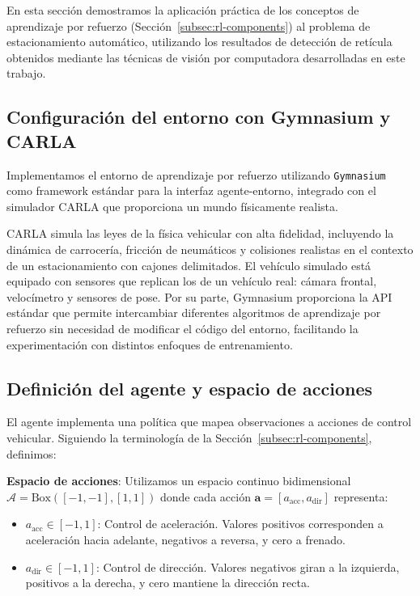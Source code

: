 
En esta sección demostramos la aplicación práctica de los conceptos de aprendizaje por refuerzo
(Sección~\ref{subsec:rl-components}) al problema de estacionamiento automático, utilizando
los resultados de detección de retícula obtenidos mediante las técnicas de visión por computadora
desarrolladas en este trabajo.

\subsection{Configuración del entorno con Gymnasium y CARLA}\label{subsec:rl-environment}

Implementamos el entorno de aprendizaje por refuerzo utilizando \texttt{Gymnasium} como framework
estándar para la interfaz agente-entorno, integrado con el simulador CARLA que proporciona
un mundo físicamente realista. 

CARLA simula las leyes de la física vehicular con alta fidelidad, incluyendo la dinámica de carrocería, 
fricción de neumáticos y colisiones realistas en el contexto de un estacionamiento con cajones delimitados. 
El vehículo simulado está equipado con sensores que replican los de un vehículo real: cámara frontal, 
velocímetro y sensores de pose. Por su parte, Gymnasium proporciona la API estándar que permite 
intercambiar diferentes algoritmos de aprendizaje por refuerzo sin necesidad de modificar el código 
del entorno, facilitando la experimentación con distintos enfoques de entrenamiento.

\subsection{Definición del agente y espacio de acciones}\label{subsec:rl-agent}

El agente implementa una política que mapea observaciones a acciones de control vehicular.
Siguiendo la terminología de la Sección~\ref{subsec:rl-components}, definimos:


\textbf{Espacio de acciones}: Utilizamos un espacio continuo bidimensional
$\mathcal{A} = \text{Box}([-1, -1], [1, 1])$ donde cada acción $\mathbf{a} = [a_{\text{acc}}, a_{\text{dir}}]$ representa:
\begin{itemize}
    \item $a_{\text{acc}} \in [-1, 1]$: Control de aceleración. Valores positivos corresponden
    a aceleración hacia adelante, negativos a reversa, y cero a frenado.
    \item $a_{\text{dir}} \in [-1, 1]$: Control de dirección. Valores negativos giran a la izquierda,
    positivos a la derecha, y cero mantiene la dirección recta.
\end{itemize}

